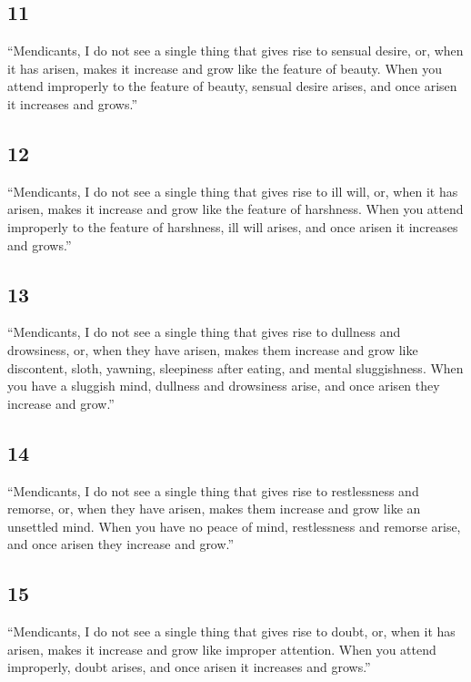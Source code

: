 \documentclass[12pt,openany]{book}%
\begin{document}
\subsection*{11 }

“Mendicants, I do not see a single thing that gives rise to sensual desire, or, when it has arisen, makes it increase and grow like the feature of beauty. When you attend improperly to the feature of beauty, sensual desire arises, and once arisen it increases and grows.” 

\subsection*{12 }

“Mendicants, I do not see a single thing that gives rise to ill will, or, when it has arisen, makes it increase and grow like the feature of harshness. When you attend improperly to the feature of harshness, ill will arises, and once arisen it increases and grows.” 

\subsection*{13 }

“Mendicants, I do not see a single thing that gives rise to dullness and drowsiness, or, when they have arisen, makes them increase and grow like discontent, sloth, yawning, sleepiness after eating, and mental sluggishness. When you have a sluggish mind, dullness and drowsiness arise, and once arisen they increase and grow.” 

\subsection*{14 }

“Mendicants, I do not see a single thing that gives rise to restlessness and remorse, or, when they have arisen, makes them increase and grow like an unsettled mind. When you have no peace of mind, restlessness and remorse arise, and once arisen they increase and grow.” 

\subsection*{15 }

“Mendicants, I do not see a single thing that gives rise to doubt, or, when it has arisen, makes it increase and grow like improper attention. When you attend improperly, doubt arises, and once arisen it increases and grows.” 
\end{document}
